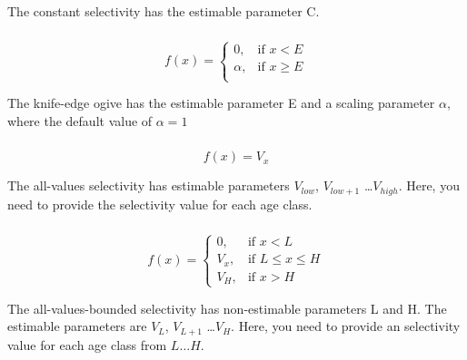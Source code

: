 The constant selectivity has the estimable parameter C. 

\subsubsection[Knife-edge]{}

\begin{equation}
f(x)= \begin{cases}
  0, & \text{if $x < E$} \\
  \alpha, & \text{if $x \ge E$}\\ 
  \end{cases} 
\end{equation}

The knife-edge ogive has the estimable parameter E and a scaling parameter $\alpha$, where the default value of $\alpha = 1$

\subsubsection[All-values]{}

\begin{equation}
f(x)=V_x
\end{equation}

The all-values selectivity has estimable parameters $V_{low}$, $V_{low+1}$ \ldots $V_{high}$. Here, you need to provide the selectivity value for each age class.

\subsubsection[All-values-bounded]{}

\begin{equation}
f(x)=\begin{cases}
		 0, & \text{if $x < L$} \\
		 V_x, & \text{if $L \le x \le H$} \\
		 V_H, & \text{if $x > H$}
  \end{cases}
\end{equation}

The all-values-bounded selectivity has non-estimable parameters L and H. The estimable parameters are $V_L$, $V_{L+1}$ \ldots $V_H$. Here, you need to provide an selectivity value for each age class from $L \ldots H$.

\subsubsection[Increasing]{}

